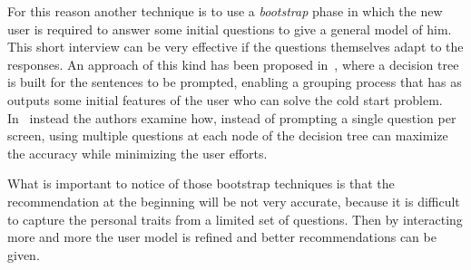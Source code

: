 For this reason another technique is to use a \textit{bootstrap} phase in which the new user is required to answer some initial questions to give a general model of him. This short interview can be very effective if the questions themselves adapt to the responses. An approach of this kind has been proposed in~\cite{lika2014facing}, where a decision tree is built for the sentences to be prompted, enabling a grouping process that has as outputs some initial features of the user who can solve the cold start problem. In~\cite{sun2013learning} instead the authors examine how, instead of prompting a single question per screen, using multiple questions at each node of the decision tree can maximize the accuracy while minimizing the user efforts.

What is important to notice of those bootstrap techniques is that the recommendation at the beginning will be not very accurate, because it is difficult to capture the personal traits from a limited set of questions. Then by interacting more and more the user model is refined and better recommendations can be given.
